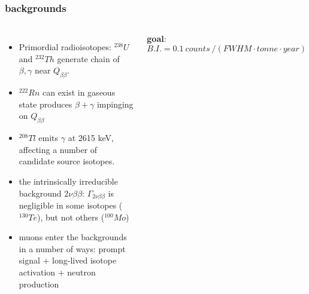 \documentclass{beamer}
\begin{document}
	\begin{frame}
		\frametitle{backgrounds}
		\begin{columns}[c] %
			
			\begin{itemize}
			\item Primordial radioisotopes: $^{238}U$ and $^{232}Th$ generate chain of $\beta , \gamma$ near $Q_{\beta\beta}$.
			\item $^{222}Rn$ can exist in gaseous state produces $\beta + \gamma$ impinging on $Q_{\beta\beta}$
			\item $^{208}Tl$ emits $\gamma$ at 2615 keV, affecting a number of candidate source isotopes.
			\item the intrinsically irreducible background $2\nu\beta\beta$: $\Gamma_{2\nu\beta\beta}$ is negligible in some isotopes ($^{130}Te$), but not others ($^{100}Mo$)
			\item muons enter the backgrounds in a number of ways: prompt signal + long-lived isotope activation + neutron production
			\end{itemize}			 
			
		
			\textbf{goal}: $B.I. = 0.1 \ counts\ / \left( FWHM\cdot tonne \cdot year \right)$
			
		\end{columns}
	\end{frame}
	
\end{document}

